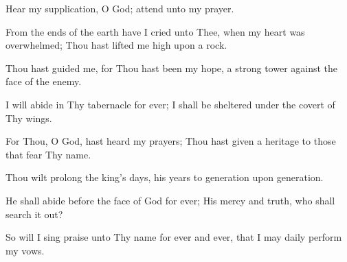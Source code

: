 Hear my supplication, O God; attend unto my prayer.

From the ends of the earth have I cried unto Thee, when my heart was overwhelmed; Thou hast lifted me high upon a rock.

Thou hast guided me, for Thou hast been my hope, a strong tower against the face of the enemy.

I will abide in Thy tabernacle for ever; I shall be sheltered under the covert of Thy wings.

For Thou, O God, hast heard my prayers; Thou hast given a heritage to those that fear Thy name.

Thou wilt prolong the king’s days, his years to generation upon generation.

He shall abide before the face of God for ever; His mercy and truth, who shall search it out?

So will I sing praise unto Thy name for ever and ever, that I may daily perform my vows.

